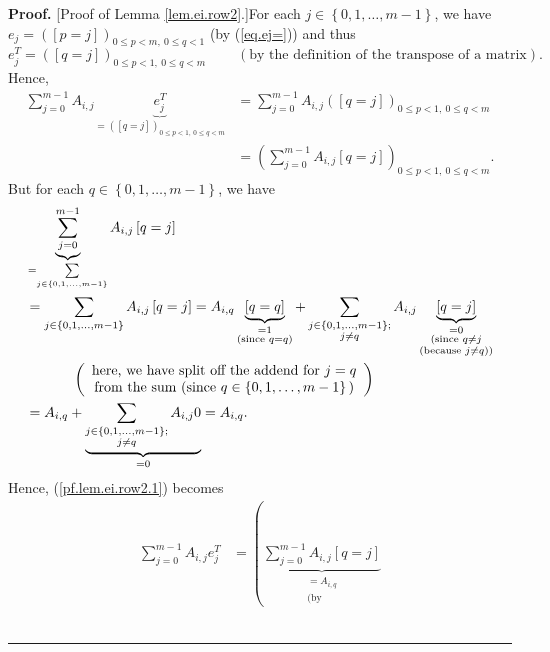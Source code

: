 \documentclass[numbers=enddot,12pt,final,onecolumn,notitlepage]{scrartcl}%
\theoremstyle{definition}
\newenvironment{proof}[1][Proof]{\noindent\textbf{#1.} }{\ \rule{0.5em}{0.5em}}
\let\sumnonlimits\sum
\renewcommand{\sum}{\sumnonlimits\limits}
\newenvironment{verlong}{}{}
\begin{document}
\begin{verlong}
\begin{proof}
[Proof of Lemma \ref{lem.ei.row2}.]For each $j\in\left\{  0,1,\ldots
,m-1\right\}  $, we have $e_{j}=\left(  \left[  p=j\right]  \right)  _{0\leq
p<m,\ 0\leq q<1}$ (by (\ref{eq.ej=})) and thus
\[
e_{j}^{T}=\left(  \left[  q=j\right]  \right)  _{0\leq p<1,\ 0\leq
q<m}\ \ \ \ \ \ \ \ \ \ \left(  \text{by the definition of the transpose of a
matrix}\right)  .
\]
Hence,%
\begin{align}
\sum_{j=0}^{m-1}A_{i,j}\underbrace{e_{j}^{T}}_{=\left(  \left[  q=j\right]
\right)  _{0\leq p<1,\ 0\leq q<m}}  &  =\sum_{j=0}^{m-1}A_{i,j}\left(  \left[
q=j\right]  \right)  _{0\leq p<1,\ 0\leq q<m}\nonumber\\
&  =\left(  \sum_{j=0}^{m-1}A_{i,j}\left[  q=j\right]  \right)  _{0\leq
p<1,\ 0\leq q<m}. \label{pf.lem.ei.row2.1}%
\end{align}
But for each $q\in\left\{  0,1,\ldots,m-1\right\}  $, we have%
\begin{align}
&  \underbrace{\sum_{j=0}^{m-1}}_{=\sum_{j\in\left\{  0,1,\ldots,m-1\right\}
}}A_{i,j}\left[  q=j\right] \nonumber\\
&  =\sum_{j\in\left\{  0,1,\ldots,m-1\right\}  }A_{i,j}\left[  q=j\right]
=A_{i,q}\underbrace{\left[  q=q\right]  }_{\substack{=1\\\text{(since
}q=q\text{)}}}+\sum_{\substack{j\in\left\{  0,1,\ldots,m-1\right\}  ;\\j\neq
q}}A_{i,j}\underbrace{\left[  q=j\right]  }_{\substack{=0\\\text{(since }q\neq
j\\\text{(because }j\neq q\text{))}}}\nonumber\\
&  \ \ \ \ \ \ \ \ \ \ \left(
\begin{array}
[c]{c}%
\text{here, we have split off the addend for }j=q\\
\text{from the sum (since }q\in\left\{  0,1,\ldots,m-1\right\}  \text{)}%
\end{array}
\right) \nonumber\\
&  =A_{i,q}+\underbrace{\sum_{\substack{j\in\left\{  0,1,\ldots,m-1\right\}
;\\j\neq q}}A_{i,j}0}_{=0}=A_{i,q}. \label{pf.lem.ei.row2.2}%
\end{align}
Hence, (\ref{pf.lem.ei.row2.1}) becomes
\begin{align*}
\sum_{j=0}^{m-1}A_{i,j}e_{j}^{T}  &  =\left(  \underbrace{\sum_{j=0}%
^{m-1}A_{i,j}\left[  q=j\right]  }_{\substack{=A_{i,q}\\\text{(by
}}}
\end{align*}
\end{proof}
\end{verlong}
\end{document}
